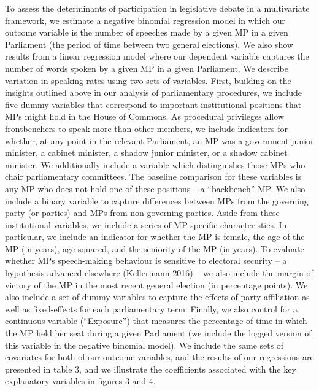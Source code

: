 To assess the determinants of participation in legislative debate in a multivariate framework, we estimate a negative binomial regression model in which our outcome variable is the number of speeches made by a given MP in a given Parliament (the period of time between two general elections). We also show results from a linear regression model where our dependent variable captures the number of words spoken by a given MP in a given Parliament.
We describe variation in speaking rates using two sets of variables. First, building on the insights outlined above in our analysis of parliamentary procedures, we include five dummy variables that correspond to important institutional positions that MPs might hold in the House of Commons. As procedural privileges allow frontbenchers to speak more than other members, we include indicators for whether, at any point in the relevant Parliament, an MP was a government junior minister, a cabinet minister, a shadow junior minister, or a shadow cabinet minister. We additionally include a variable which distinguishes those MPs who chair parliamentary committees. The baseline comparison for these variables is any MP who does not hold one of these positions – a “backbench” MP. We also include a binary variable to capture differences between MPs from the governing party (or parties) and MPs from non-governing parties.
Aside from these institutional variables, we include a series of MP-specific characteristics. In particular, we include an indicator for whether the MP is female, the age of the MP (in years), age squared, and the seniority of the MP (in years). To evaluate whether MPs speech-making behaviour is sensitive to electoral security – a hypothesis advanced elsewhere (Kellermann 2016) – we also include the margin of victory of the MP in the most recent general election (in percentage points). We also include a set of dummy variables to capture the effects of party affiliation as well as fixed-effects for each parliamentary term. Finally, we also control for a continuous variable (“Exposure”) that measures the percentage of time in which the MP held her seat during a given Parliament (we include the logged version of this variable in the negative binomial model).
We include the same sets of covariates for both of our outcome variables, and the results of our regressions are presented in table 3, and we illustrate the coefficients associated with the key explanatory variables in figures 3 and 4.


